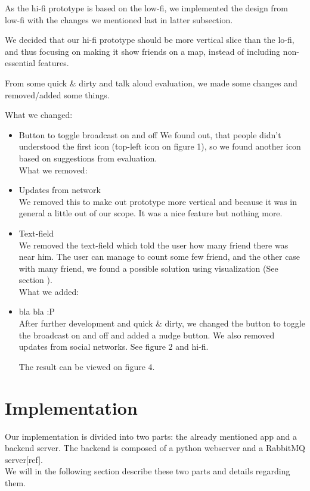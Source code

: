\documentclass[runningheads,a4paper]{llncs}
\begin{document}
As the hi-fi prototype is based on the low-fi, we implemented the design from low-fi with the changes we mentioned last in latter subsection. 

We decided that our hi-fi prototype should be more vertical slice than the lo-fi, and thus focusing on making it show friends on a map, instead of including non-essential features. 

From some quick \& dirty and talk aloud evaluation, we made some changes and removed/added some things. 

What we changed: 
\begin{itemize}
\item Button to toggle broadcast on and off
We found out, that people didn’t understood the first icon (top-left icon on figure 1), so we found another icon based on suggestions from evaluation. \\


What we removed:
\item Updates from network\\
We removed this to make out prototype more vertical and because it was in general a little out of our scope. It was a nice feature but nothing more. \\

\item Text-field\\
We removed the text-field which told the user how many friend there was near him. The user can manage to count some few friend, and the other case with many friend, we found a possible solution using visualization (See section ). \\

What we added: 
\item bla bla :P \\
After further development and quick \& dirty, we changed the button to toggle the broadcast on and off and added a nudge button. We also removed updates from social networks. See figure 2 and hi-fi. 

The result can be viewed on figure 4. 


\end{itemize}

\section{Implementation}
Our implementation is divided into two parts: the already mentioned app and a backend server. The backend is composed of a python webserver and a RabbitMQ server[ref]. \\
We will in the following section describe these two parts and details regarding them. 
\end{document}
